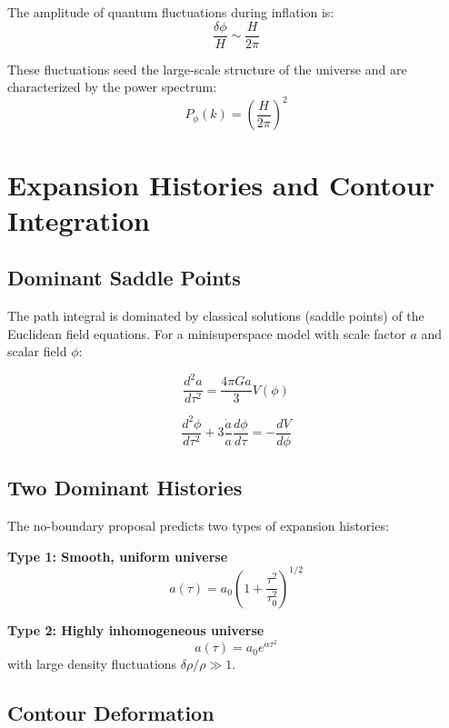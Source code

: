 \documentclass[12pt,a4paper]{article}
\begin{document}
The amplitude of quantum fluctuations during inflation is:
\begin{equation}
\frac{\delta\phi}{H} \sim \frac{H}{2\pi}
\end{equation}

These fluctuations seed the large-scale structure of the universe and are characterized by the power spectrum:
\begin{equation}
P_\phi(k) = \left(\frac{H}{2\pi}\right)^2
\end{equation}

\section{Expansion Histories and Contour Integration}

\subsection{Dominant Saddle Points}

The path integral is dominated by classical solutions (saddle points) of the Euclidean field equations. For a minisuperspace model with scale factor $a$ and scalar field $\phi$:

\begin{equation}
\frac{d^2a}{d\tau^2} = \frac{4\pi G a}{3}V(\phi)
\end{equation}

\begin{equation}
\frac{d^2\phi}{d\tau^2} + 3\frac{\dot{a}}{a}\frac{d\phi}{d\tau} = -\frac{dV}{d\phi}
\end{equation}

\subsection{Two Dominant Histories}

The no-boundary proposal predicts two types of expansion histories:

\textbf{Type 1: Smooth, uniform universe}
\begin{equation}
a(\tau) = a_0\left(1 + \frac{\tau^2}{\tau_0^2}\right)^{1/2}
\end{equation}

\textbf{Type 2: Highly inhomogeneous universe}
\begin{equation}
a(\tau) = a_0 e^{\alpha\tau^2}
\end{equation}
with large density fluctuations $\delta\rho/\rho \gg 1$.

\subsection{Contour Deformation}
\end{document}
